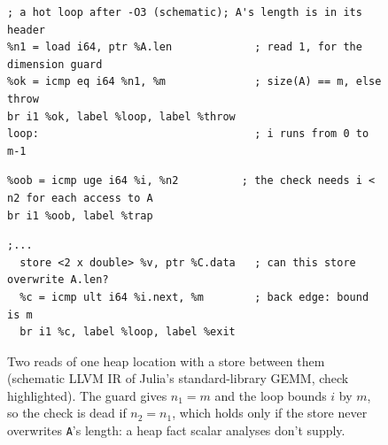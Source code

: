 \documentclass[acmsmall,screen,nonacm]{acmart}
\newlength{\chkcw}\newlength{\chkpad}
\newenvironment{chkbox}[2]{\par\vspace{1pt}\raggedright\noindent
  \hspace*{\dimexpr 0.5em+#1\chkcw-\chkpad\relax}%
  \tcolorbox[nobeforeafter, colback=checkpink, colframe=checkpink,
    boxrule=0pt, arc=3pt, boxsep=0pt, left=\chkpad, right=\chkpad,
    top=1.5pt, bottom=1.5pt, width=\dimexpr #2\chkcw+2\chkpad\relax]}%
  {\endtcolorbox\par\vspace{1pt}}
\begin{document}
\begin{figure}[t]
\centering
\begin{lstlisting}[style=odessy,
    morekeywords={load,store,icmp,ugt,ult,eq,br,label,i64,i1,ptr,x,double},
    comment={[l]{;}}]
; a hot loop after -O3 (schematic); A's length is in its header
%n1 = load i64, ptr %A.len             ; read 1, for the dimension guard
%ok = icmp eq i64 %n1, %m              ; size(A) == m, else throw
br i1 %ok, label %loop, label %throw
loop:                                  ; i runs from 0 to m-1
\end{lstlisting}
\begin{chkbox}{2}{82}
\begin{lstlisting}[style=odessy, xleftmargin=0pt,
    morekeywords={load,store,icmp,ugt,ult,eq,br,label,i64,i1,ptr,x,double},
    comment={[l]{;}}]
%n2 = load i64, ptr %A.len           ; read 2: the check reloads the array length
%oob = icmp uge i64 %i, %n2          ; the check needs i < n2 for each access to A
br i1 %oob, label %trap
\end{lstlisting}
\end{chkbox}
\begin{lstlisting}[style=odessy,
    morekeywords={load,store,icmp,ugt,ult,eq,br,label,i64,i1,ptr,x,double},
    comment={[l]{;}}]
  ;...
  store <2 x double> %v, ptr %C.data   ; can this store overwrite A.len?
  %c = icmp ult i64 %i.next, %m        ; back edge: bound is m
  br i1 %c, label %loop, label %exit
\end{lstlisting}
\caption{Two reads of one heap location with a store between them
(schematic LLVM IR of Julia's standard-library GEMM, check highlighted). The guard
gives $n_1 = m$ and the loop bounds $i$ by $m$, so the check is dead if
$n_2 = n_1$, which holds only if the store never overwrites \texttt{A}'s
length: a heap fact scalar analyses don't supply.}
\label{fig:frame-example}
\end{figure}
\end{document}
